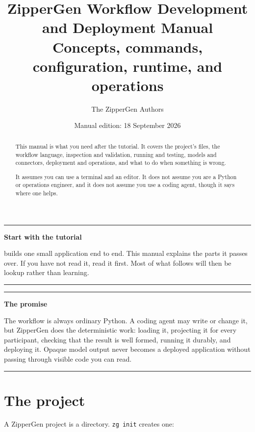\documentclass[11pt,a4paper]{article}
\title{\color{ZipperInk}\Huge\textbf{ZipperGen Workflow Development and Deployment Manual}\\[5pt]
\Large Concepts, commands, configuration, runtime, and operations}
\author{The ZipperGen Authors}
\date{Manual edition: 18 September 2026}
\newenvironment{notebox}[1]
{\begin{center}\begin{minipage}{0.94\linewidth}
 \color{ZipperInk}\hrule\vspace{5pt}\textbf{#1}\par\smallskip}
{\vspace{5pt}\hrule\end{minipage}\end{center}}
\begin{document}
\maketitle

\begin{abstract}
This manual is what you need after the tutorial. It covers the project's files,
the workflow language, inspection and validation, running and testing, models
and connectors, deployment and operations, and what to do when something is
wrong.

It assumes you can use a terminal and an editor. It does not assume you are a
Python or operations engineer, and it does not assume you use a coding agent,
though it says where one helps.
\end{abstract}

\begin{notebox}{Start with the tutorial}
 builds one small application end to end.
This manual explains the parts it passes over. If you have not
read it, read it first. Most of what follows will then be lookup rather than
learning.
\end{notebox}

\begin{notebox}{The promise}
The workflow is always ordinary Python. A coding agent may write or change it,
but ZipperGen does the deterministic work: loading it, projecting it for every
participant, checking that the result is well formed, running it durably, and
deploying it. Opaque model output never becomes a deployed application without
passing through visible code you can read.
\end{notebox}

\tableofcontents
\newpage

\section{The project}

A ZipperGen project is a directory. \texttt{zg init} creates one:
\end{document}
